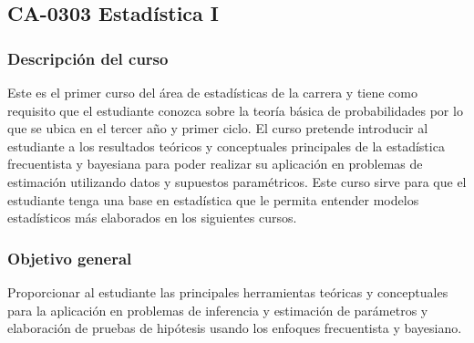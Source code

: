 \newpage
\subsection*{CA-0303 Estadística I}

\hypertarget{MA0503}{}
\begin{refsection}
\begin{table}[H]
\end{table}

\subsubsection*{Descripción del curso}

Este es el primer curso del área de estadísticas de la carrera y tiene como requisito que el estudiante conozca sobre la teoría básica de probabilidades por lo que se ubica en el tercer año y primer ciclo. El curso pretende introducir al estudiante a los resultados teóricos y conceptuales principales de la estadística frecuentista y bayesiana para poder realizar su aplicación en problemas de estimación utilizando datos y supuestos paramétricos. Este curso sirve para que el estudiante tenga una base en estadística que le permita entender modelos estadísticos más elaborados en los siguientes cursos.

\subsubsection*{Objetivo general}

Proporcionar al estudiante las principales herramientas teóricas y conceptuales para la aplicación en problemas de inferencia y estimación de parámetros y elaboración de pruebas de hipótesis usando los enfoques frecuentista y bayesiano.


\end{refsection}
